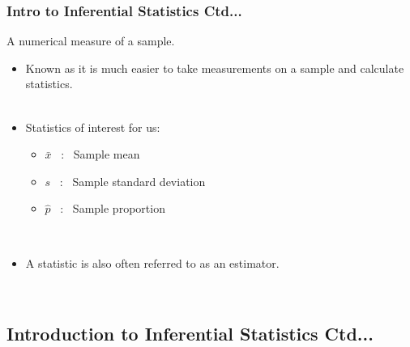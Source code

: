 \documentclass[xcolor=svgnames, compress]{beamer}
\begin{document}
\begin{frame}
\frametitle{Intro to Inferential Statistics Ctd...} 

\begin{definition}[Statistic]
A numerical measure of a sample.
\end{definition}

\begin{itemize}\justifying
\item	\alert{Known} as it is much easier to take measurements on a sample and calculate statistics.\\
\hfill\\
\item	Statistics of interest for us:
	\begin{itemize}\justifying
	\item	$\bar{x}$	~:~ Sample mean
	\item	$s$		~:~ Sample standard deviation
	\item	$\hat{p}$	~:~ Sample proportion
	\end{itemize}
\hfill\\
\vspace{0.2cm}
\item	A statistic is also often referred to as an \alert{estimator}.
\end{itemize}

\hfill\\


\end{frame}







\subsection*{Introduction to Inferential Statistics Ctd...}
\end{document}

